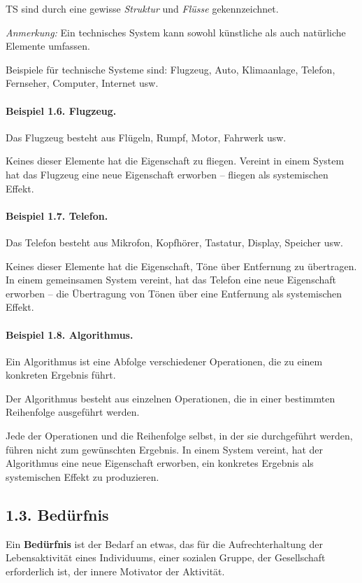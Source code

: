 \documentclass[11pt,a4paper]{article}
\begin{document}
TS sind durch eine gewisse \emph{Struktur} und \emph{Flüsse} gekennzeichnet.

\emph{Anmerkung:} Ein technisches System kann sowohl künstliche als auch
natürliche Elemente umfassen.

Beispiele für technische Systeme sind: Flugzeug, Auto, Klimaanlage, Telefon,
Fernseher, Computer, Internet usw.

\paragraph{Beispiel 1.6. Flugzeug.}
Das Flugzeug besteht aus Flügeln, Rumpf, Motor, Fahrwerk usw.

Keines dieser Elemente hat die Eigenschaft zu fliegen. Vereint in einem System
hat das Flugzeug eine neue Eigenschaft erworben -- fliegen als systemischen
Effekt.

\paragraph{Beispiel 1.7. Telefon.}
Das Telefon besteht aus Mikrofon, Kopfhörer, Tastatur, Display, Speicher usw.

Keines dieser Elemente hat die Eigenschaft, Töne über Entfernung zu
übertragen. In einem gemeinsamen System vereint, hat das Telefon eine neue
Eigenschaft erworben -- die Übertragung von Tönen über eine Entfernung als
systemischen Effekt.

\paragraph{Beispiel 1.8. Algorithmus.}
Ein Algorithmus ist eine Abfolge verschiedener Operationen, die zu einem
konkreten Ergebnis führt.

Der Algorithmus besteht aus einzelnen Operationen, die in einer bestimmten
Reihenfolge ausgeführt werden.

Jede der Operationen und die Reihenfolge selbst, in der sie durchgeführt
werden, führen nicht zum gewünschten Ergebnis. In einem System vereint, hat
der Algorithmus eine neue Eigenschaft erworben, ein konkretes Ergebnis als
systemischen Effekt zu produzieren.

\subsection*{1.3. Bedürfnis}

Ein \textbf{Bedürfnis} ist der Bedarf an etwas, das für die Aufrechterhaltung
der Lebensaktivität eines Individuums, einer sozialen Gruppe, der Gesellschaft
erforderlich ist, der innere Motivator der Aktivität.
\end{document}
